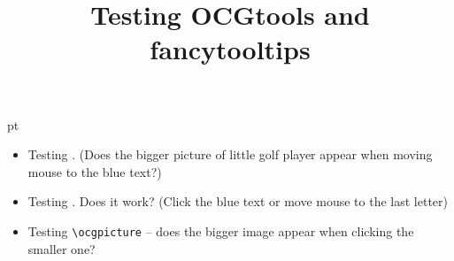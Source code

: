\documentclass{article}
\begin{document}
\title{Testing OCGtools and fancytooltips}
\maketitle
{} pt
\begin{itemize}
\item
Testing . (Does the bigger picture of little golf 
player appear when moving mouse to the blue text?)  

\item
Testing . Does it work? 
(Click the blue text or move mouse to the last letter)

\item
Testing \verb|\ocgpicture| -- does the bigger image appear when clicking the 
smaller one?  
\begin{center}\end{center} 
\end{itemize}
\end{document}
